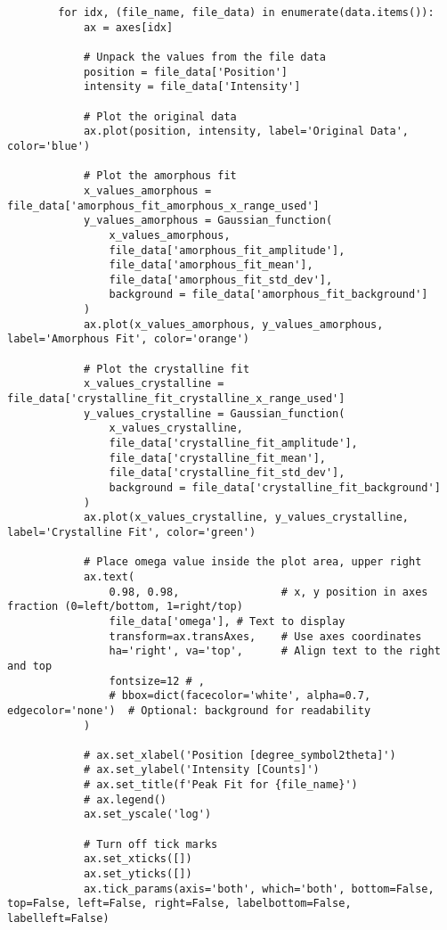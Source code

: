 \begin{lstlisting}
        for idx, (file_name, file_data) in enumerate(data.items()):
            ax = axes[idx]

            # Unpack the values from the file data
            position = file_data['Position']
            intensity = file_data['Intensity']

            # Plot the original data
            ax.plot(position, intensity, label='Original Data', color='blue')

            # Plot the amorphous fit
            x_values_amorphous = file_data['amorphous_fit_amorphous_x_range_used']
            y_values_amorphous = Gaussian_function(
                x_values_amorphous,
                file_data['amorphous_fit_amplitude'],
                file_data['amorphous_fit_mean'],
                file_data['amorphous_fit_std_dev'],
                background = file_data['amorphous_fit_background']
            )
            ax.plot(x_values_amorphous, y_values_amorphous, label='Amorphous Fit', color='orange')

            # Plot the crystalline fit
            x_values_crystalline = file_data['crystalline_fit_crystalline_x_range_used']
            y_values_crystalline = Gaussian_function(
                x_values_crystalline,
                file_data['crystalline_fit_amplitude'],
                file_data['crystalline_fit_mean'],
                file_data['crystalline_fit_std_dev'],
                background = file_data['crystalline_fit_background']
            )
            ax.plot(x_values_crystalline, y_values_crystalline, label='Crystalline Fit', color='green')

            # Place omega value inside the plot area, upper right
            ax.text(
                0.98, 0.98,                # x, y position in axes fraction (0=left/bottom, 1=right/top)
                file_data['omega'], # Text to display
                transform=ax.transAxes,    # Use axes coordinates
                ha='right', va='top',      # Align text to the right and top
                fontsize=12 # ,
                # bbox=dict(facecolor='white', alpha=0.7, edgecolor='none')  # Optional: background for readability
            )

            # ax.set_xlabel('Position [degree_symbol2theta]')
            # ax.set_ylabel('Intensity [Counts]')
            # ax.set_title(f'Peak Fit for {file_name}')
            # ax.legend()
            ax.set_yscale('log')

            # Turn off tick marks
            ax.set_xticks([])
            ax.set_yticks([])
            ax.tick_params(axis='both', which='both', bottom=False, top=False, left=False, right=False, labelbottom=False, labelleft=False)


\end{lstlisting}
